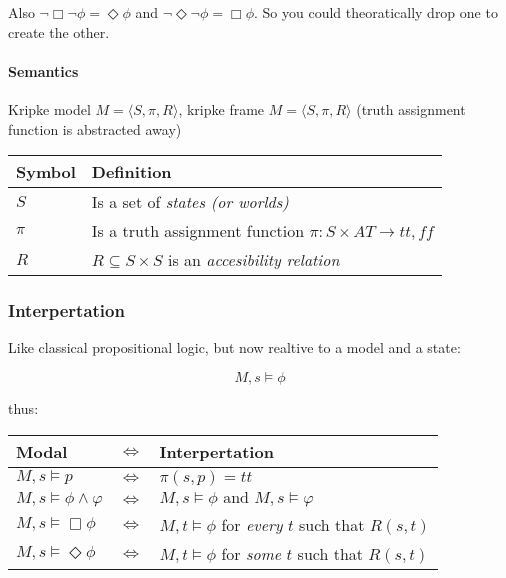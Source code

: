 \documentclass{article}
\begin{document}
\noindent
Also $\neg\Box\neg\phi = \Diamond\phi$ and
$\neg\Diamond\neg\phi = \Box\phi$. So you could theoratically
drop one to create the other.

\paragraph{Semantics} Kripke %
model $M=\langle S,\pi,R \rangle$, kripke frame $M=\langle S,\pi,R \rangle$
(truth assignment function is abstracted away)

\begin{tabular}{ll}
	Symbol & Definition \\ \toprule
	$S$ & Is a set of \emph{states (or worlds)} \\
	$\pi$ & Is a truth assignment function $\pi : S \times AT \to {tt, ff}$ \\
	$R$	& $R \subseteq S \times S$ is an \emph{accesibility relation}\\
\end{tabular}

\subsubsection{Interpertation}

\begin{center}
\end{center}

Like classical propositional logic, but now realtive to a model and a state:

\[ M,s \vDash \phi \]

thus:

\begin{tabular}{lll}
	Modal & $\Leftrightarrow$ & Interpertation \\ \toprule
$M,s \vDash p$ & $\Leftrightarrow$ & $\pi(s,p) = tt$ \\
$M,s \vDash \phi \wedge \varphi $ & $\Leftrightarrow$ & $ M,s \vDash \phi
\mbox{ and }M,s\vDash \varphi$ \\
$M,s \vDash \Box \phi $ & $\Leftrightarrow$ & $ M,t \vDash \phi $ for 
\emph{every} $t$ such that $R(s,t)$ \\
$M,s \vDash \Diamond \phi $ & $\Leftrightarrow$ & $ M,t \vDash \phi $ for 
\emph{some} $t$ such that $R(s,t)$ \\\bottomrule
\end{tabular}
\end{document}
